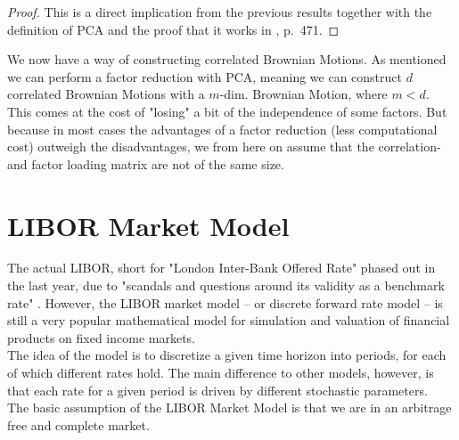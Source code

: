 \documentclass[12pt]{article}
\begin{document}
	\begin{proof}
		This is a direct implication from the previous results together with the definition of PCA and the proof that it works in \cite{FriesBook}, p.\ 471.
	\end{proof}
	We now have a way of constructing correlated Brownian Motions. As mentioned we can perform a factor reduction with PCA, meaning we can construct $d$ correlated Brownian Motions with a $m$-dim. Brownian Motion, where $m < d$. This comes at the cost of "losing" a bit of the independence of some factors. But because in most cases the advantages of a factor reduction (less computational cost) outweigh the disadvantages, we from here on assume that the correlation- and factor loading matrix are not of the same size.
	
	
	
	
	\pagebreak
	\section{LIBOR Market Model}\label{sec::LIBORModel}
	
	The actual LIBOR, short for "London Inter-Bank Offered Rate" phased out in the last year, due to "scandals and questions around its validity as a benchmark rate" \cite{investopediaLIBOR}.
	However, the LIBOR market model -- or discrete forward rate model -- is still a very popular mathematical model for simulation and valuation of financial products on fixed income markets.\\
	The idea of the model is to discretize a given time horizon into periods, for each of which different rates hold. The main difference to other models, however, is that each rate for a given period is driven by different stochastic parameters.
	\\
	The basic assumption of the LIBOR Market Model is that we are in an arbitrage free and complete market.
	
\end{document}
